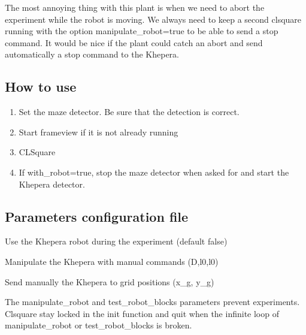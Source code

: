 The most annoying thing with this plant is when we need to abort 
the experiment while the robot is moving. We always need to keep a 
second clsquare running with the option manipulate\_robot=true to be 
able to send a stop command. It would be nice if the plant could catch 
an abort and send automatically a stop command to the Khepera.

\subsection{How to use}
    \begin{enumerate}
        \item Set the maze detector. Be sure that the detection is correct.
        \item Start frameview if it is not already running
        \item CLSquare
        \item If with\_robot=true, stop the maze detector when asked 
            for and start the Khepera detector.
    \end{enumerate}

\subsection{Parameters configuration file}
    \begin{description} \itemindent=-15pt
        \item[with\_robot] Use the Khepera robot during the experiment 
            (default false)
        \item[manipulate\_robot] Manipulate the Khepera with manual 
            commands (D,l0,l0)
        \item[test\_robot\_blocks] Send manually the Khepera to grid 
            positions (x\_g, y\_g)
    \end{description}

The manipulate\_robot and test\_robot\_blocks parameters prevent 
experiments. Clsquare stay locked in the init function and quit when 
the infinite loop of manipulate\_robot or test\_robot\_blocks is broken. 
